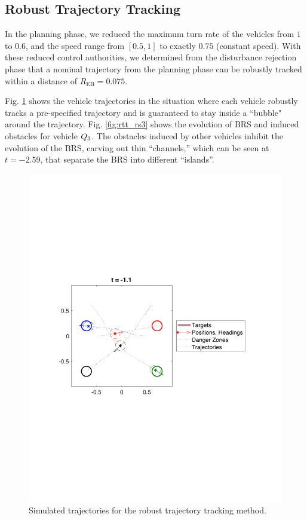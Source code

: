 \subsection{Robust Trajectory Tracking}
In the planning phase, we reduced the maximum turn rate of the vehicles from $1$ to $0.6$, and the speed range from $[0.5, 1]$ to exactly $0.75$ (constant speed). With these reduced control authorities, we determined from the disturbance rejection phase that a nominal trajectory from the planning phase can be robustly tracked within a distance of $R_{\text{EB}} = 0.075$.

Fig. \ref{fig:rtt_traj} shows the vehicle trajectories in the situation where each vehicle robustly tracks a pre-specified trajectory and is guaranteed to stay inside a ``bubble" around the trajectory. Fig. \ref{fig:rtt_rs3} shows the evolution of BRS and induced obstacles for vehicle $Q_3$. The obstacles induced by other vehicles inhibit the evolution of the BRS, carving out thin “channels,” which can be seen at $t = -2.59$, that separate the BRS into different “islands”. %

\begin{figure}
  \centering
  \includegraphics[width=\columnwidth]{"fig/rtt_traj"}
  \caption{Simulated trajectories for the robust trajectory tracking method.}
  \label{fig:rtt_traj}
\end{figure}

